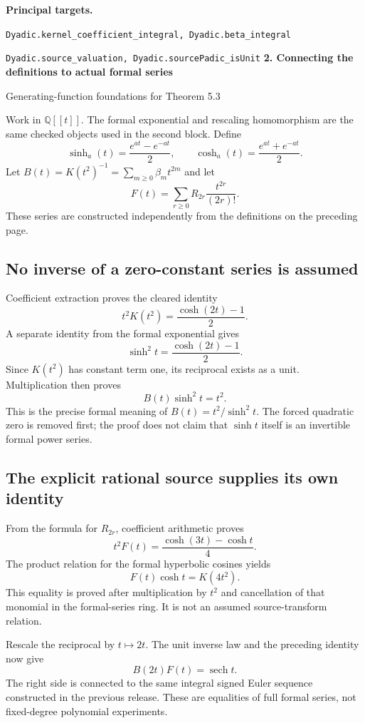 \documentclass[11pt]{article}
\newcommand{\Q}{\mathbb Q}\newcommand{\Z}{\mathbb Z}\newcommand{\N}{\mathbb N}
\newcommand{\target}[1]{{\footnotesize\texttt{#1}}}
\newcommand{\pageheading}[2]{{\Large\bfseries\color{ink}#1}\par{\small #2}\par\medskip}
\newcommand{\sech}{\operatorname{sech}}
\begin{document}
\textbf{Principal targets.}\par
\target{Dyadic.kernel\_coefficient\_integral, Dyadic.beta\_integral}\par
\target{Dyadic.source\_valuation, Dyadic.sourcePadic\_isUnit}
\newpage
\pageheading{2. Connecting the definitions to actual formal series}{Generating-function foundations for Theorem 5.3}
Work in $\Q[[t]]$. The formal exponential and rescaling homomorphism are the same checked objects used in the second block. Define
\[
 \sinh_a(t)=\frac{e^{at}-e^{-at}}2,\qquad
 \cosh_a(t)=\frac{e^{at}+e^{-at}}2.
\]
Let $B(t)=K(t^2)^{-1}=\sum_{m\geq0}\beta_mt^{2m}$ and let
\[
 F(t)=\sum_{r\geq0}R_{2r}\frac{t^{2r}}{(2r)!}.
\]
These series are constructed independently from the definitions on the preceding page.

\subsection*{No inverse of a zero-constant series is assumed}
Coefficient extraction proves the cleared identity
\[
 t^2K(t^2)=\frac{\cosh(2t)-1}{2}.
\]
A separate identity from the formal exponential gives
\[
 \sinh^2t=\frac{\cosh(2t)-1}{2}.
\]
Since $K(t^2)$ has constant term one, its reciprocal exists as a unit. Multiplication then proves
\[
 \boxed{B(t)\sinh^2t=t^2.}
\]
This is the precise formal meaning of $B(t)=t^2/\sinh^2t$. The forced quadratic zero is removed first; the proof does not claim that $\sinh t$ itself is an invertible formal power series.

\subsection*{The explicit rational source supplies its own identity}
From the formula for $R_{2r}$, coefficient arithmetic proves
\[
 \boxed{t^2 F(t)=\frac{\cosh(3t)-\cosh t}{4}.}
\]
The product relation for the formal hyperbolic cosines yields
\[
 F(t)\cosh t=K(4t^2).
\]
This equality is proved after multiplication by $t^2$ and cancellation of that monomial in the formal-series ring. It is not an assumed source-transform relation.

Rescale the reciprocal by $t\mapsto2t$. The unit inverse law and the preceding identity now give
\[
 \boxed{B(2t)F(t)=\sech t.}
\]
The right side is connected to the same integral signed Euler sequence constructed in the previous release. These are equalities of full formal series, not fixed-degree polynomial experiments.
\end{document}
